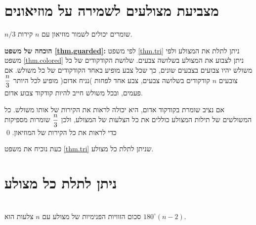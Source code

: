 \begin{center}
\end{center}


\section{מצביעת מצולעים לשמירה על מוזיאונים}

\begin{theorem}
$n/3$
שומרים יכולים לשמור מוזיאון עם 
$n$
קירות.
\end{theorem}

\textbf{הוכחה של משפט
\ref{thm.guarded}:}
לפי משפט
\ref{thm.tri}
ניתן לתלת את המצולע ולפי משפט
\ref{thm.colored}
ניתן לצבוע את המצולע בשלושה צבעים. שלושת הקודקודים של כל משולש יהיו צבועים בצבעים שונים, כך שכל צבע מופיע באחד הקודקודים של כל משולש. אם צובעים 
$n$
קודקודים בשלושה צבעים, צבע אחד לפחות )נניח אדום( מופיע לכל היותר
$\displaystyle\frac{n}{3}$
פעמים, ובכל משולש חייב להיות קודקוד צבוע אדום.

אם נציב שומרת בקודקוד אדום, היא יכולה לראות את הקירות של אותו משולש. כל המשולשים של תילות המצולע כוללים את כל הצלעות של המצולע, ולכן
$\displaystyle\frac{n}{3}$
שומרות מספיקות כדי לראות את כל הקירות של המוזיאון.
\qed

כעת נוכיח את משפט
\ref{thm.tri}
שניתן לתלת כל מצולע.

\section{ניתן לתלת כל מצולע}

\begin{theorem}\label{thm.interior-angles-of-a-polygon}\mbox{}\\
סכום הזוויות הפנימיות של מצולע עם
$n$
צלעות הוא
$180^\circ(n-2)$.
\end{theorem}



